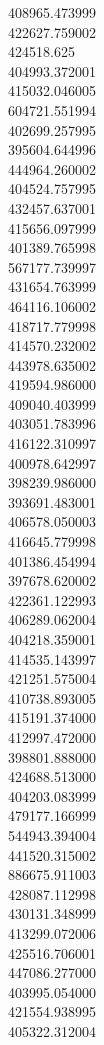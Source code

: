 408965.473999\\
422627.759002\\
424518.625\\
404993.372001\\
415032.046005\\
604721.551994\\
402699.257995\\
395604.644996\\
444964.260002\\
404524.757995\\
432457.637001\\
415656.097999\\
401389.765998\\
567177.739997\\
431654.763999\\
464116.106002\\
418717.779998\\
414570.232002\\
443978.635002\\
419594.986000\\
409040.403999\\
403051.783996\\
416122.310997\\
400978.642997\\
398239.986000\\
393691.483001\\
406578.050003\\
416645.779998\\
401386.454994\\
397678.620002\\
422361.122993\\
406289.062004\\
404218.359001\\
414535.143997\\
421251.575004\\
410738.893005\\
415191.374000\\
412997.472000\\
398801.888000\\
424688.513000\\
404203.083999\\
479177.166999\\
544943.394004\\
441520.315002\\
886675.911003\\
428087.112998\\
430131.348999\\
413299.072006\\
425516.706001\\
447086.277000\\
403995.054000\\
421554.938995\\
405322.312004\\
